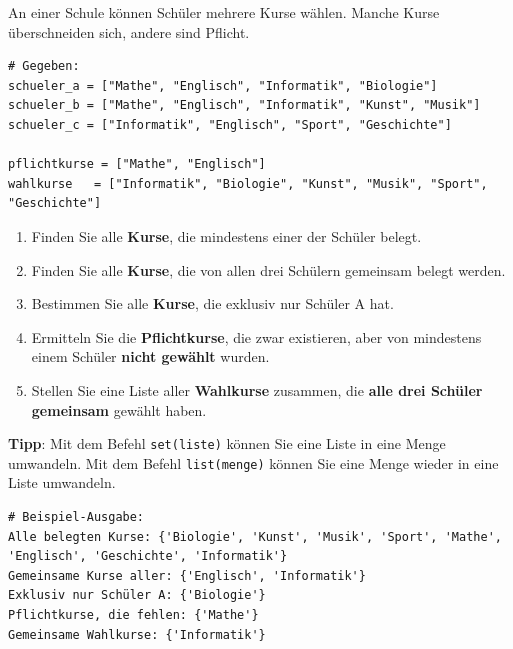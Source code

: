 \begin{myexercise}
	An einer Schule können Schüler mehrere Kurse wählen. Manche Kurse überschneiden sich, andere sind Pflicht.
	\begin{lstlisting}
# Gegeben:
schueler_a = ["Mathe", "Englisch", "Informatik", "Biologie"]
schueler_b = ["Mathe", "Englisch", "Informatik", "Kunst", "Musik"]
schueler_c = ["Informatik", "Englisch", "Sport", "Geschichte"]

pflichtkurse = ["Mathe", "Englisch"]
wahlkurse   = ["Informatik", "Biologie", "Kunst", "Musik", "Sport", "Geschichte"]
\end{lstlisting}

	\begin{enumerate}
		\item Finden Sie alle \textbf{Kurse}, die mindestens einer der Schüler belegt.
		\item Finden Sie alle \textbf{Kurse}, die von allen drei Schülern gemeinsam belegt werden.
		\item Bestimmen Sie alle \textbf{Kurse}, die exklusiv nur Schüler A hat.
		\item Ermitteln Sie die \textbf{Pflichtkurse}, die zwar existieren, aber von mindestens einem Schüler \textbf{nicht gewählt} wurden.
		\item Stellen Sie eine Liste aller \textbf{Wahlkurse} zusammen, die \textbf{alle drei Schüler gemeinsam} gewählt haben.
	\end{enumerate}

	\textbf{Tipp}: Mit dem Befehl \lstinline|set(liste)| können Sie eine Liste in eine Menge umwandeln. Mit dem Befehl \lstinline|list(menge)| können Sie eine Menge wieder in eine Liste umwandeln. %

	\begin{lstlisting}
# Beispiel-Ausgabe:
Alle belegten Kurse: {'Biologie', 'Kunst', 'Musik', 'Sport', 'Mathe', 'Englisch', 'Geschichte', 'Informatik'}
Gemeinsame Kurse aller: {'Englisch', 'Informatik'}
Exklusiv nur Schüler A: {'Biologie'}
Pflichtkurse, die fehlen: {'Mathe'}
Gemeinsame Wahlkurse: {'Informatik'}
\end{lstlisting}
	\begin{myanswer}
		\leavevmode
		
	\end{myanswer}
\end{myexercise}


